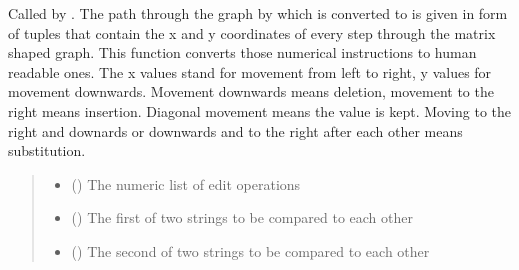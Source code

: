 \documentclass[letterpaper,10pt,english]{sphinxmanual}
\begin{document}
\begin{fulllineitems}
\label{\detokenize{documentation:loanpy.scapplier.tuples2editops}}
\pysigstartsignatures
{}
\pysigstopsignatures
\sphinxAtStartPar
Called by .
The path through the graph by which  is converted to
 is given in form of tuples that contain the x and y
coordinates of every step through the matrix shaped graph.
This function converts those numerical instructions to human readable
ones. The x values stand for movement from left to right, y values for
movement downwards.
Movement downwards means deletion, movement to the right means insertion.
Diagonal movement means the value is kept.
Moving to the right and downards or downwards and to the right after each
other means substitution.
\begin{quote}\begin{description}
\begin{itemize}
\item {} 
\sphinxAtStartPar
{} () \textendash{} The numeric list of edit operations

\item {} 
\sphinxAtStartPar
{} () \textendash{} The first of two strings to be compared to each other

\item {} 
\sphinxAtStartPar
{} () \textendash{} The second of two strings to be compared to each other


\end{itemize}
\end{description}
\end{quote}
\end{fulllineitems}
\end{document}
